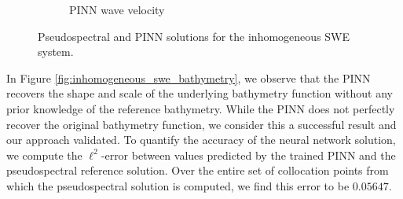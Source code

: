 \begin{figure}[h]
\begin{subfigure}[b]{0.45\textwidth}
        \caption{PINN wave velocity}
        \label{fig:inhomogeneous_pinn_swe_velocity}
    \end{subfigure}
    \caption{Pseudospectral and PINN solutions for the inhomogeneous SWE system.}
    \label{fig:inhomogeneous_swe_velocity}
\end{figure}

In Figure \ref*{fig:inhomogeneous_swe_bathymetry}, we observe that the PINN recovers the shape and scale of the 
underlying bathymetry function without any prior knowledge of the reference bathymetry. While the PINN does not 
perfectly recover the original bathymetry function, we consider this a successful result and our approach validated. 
To quantify the accuracy of the neural network solution, we compute the $\ell^2$-error between values predicted by the 
trained PINN and the pseudospectral reference solution. Over the entire set of collocation points from which the 
pseudospectral solution is computed, we find this error to be $0.05647$.

